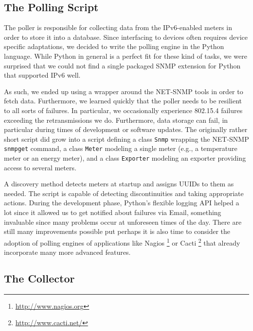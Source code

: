 \documentclass[10pt, conference, compsocconf]{IEEEtran}
\begin{document}
\subsection{The Polling Script}

The poller is responsible for collecting data from the IPv6-enabled
meters in order to store it into a database. Since interfacing to
devices often requires device specific adaptations, we decided to
write the polling engine in the Python language. While Python in general
is a perfect fit for these kind of tasks, we were surprised that we
could not find a single packaged SNMP extension for Python that supported
IPv6 well.

As such, we ended up using a wrapper around the NET-SNMP tools in
order to fetch data. Furthermore, we learned quickly that the poller
needs to be resilient to all sorts of failures. In particular, we
occasionally experience 802.15.4 failures exceeding the retransmissions
we do. Furthermore, data storage can fail, in particular during times
of development or software updates. The originally rather short script
did grow into a script defining a class \texttt{Snmp} wrapping the
NET-SNMP \texttt{snmpget} command, a class \texttt{Meter} modeling
a single meter (e.g., a temperature meter or an energy meter), and
a class \texttt{Exporter} modeling an exporter providing access to
several meters.

A discovery method detects meters at startup and assigns UUIDs to
them as needed. The script is capable of detecting discontinuities
and taking appropriate actions. During the development phase, Python's
flexible logging API helped a lot since it allowed us to get notified
about failures via Email, something invaluable since many problems
occur at unforeseen times of the day. There are still many improvements
possible put perhaps it is also time to consider the adoption of
polling engines of applications like Nagios%
\footnote{\url{http://www.nagios.org}%
} or Cacti%
\footnote{\url{http://www.cacti.net/}%
} that already incorporate many more advanced features.


\subsection{The Collector}
\end{document}
